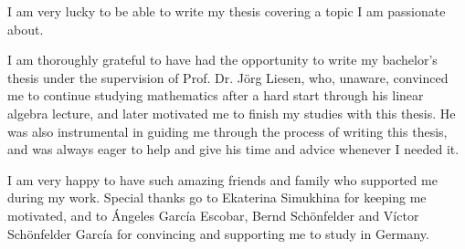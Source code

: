 I am very lucky to be able to write my thesis covering a topic I am passionate
about.

I am thoroughly grateful to have had the opportunity to write my bachelor’s thesis
under the supervision of Prof. Dr. Jörg Liesen, who, unaware, convinced me to continue studying mathematics after a hard start through his linear algebra lecture, and later motivated me to finish my studies with this thesis. He was also instrumental in guiding me through the process of writing this thesis, and was always eager to help and give his time and advice whenever I needed it.

I am very happy to have such amazing friends and family who supported me
during my work. Special thanks go to Ekaterina Simukhina for keeping me motivated, and to Ángeles García Escobar, Bernd Schönfelder and Víctor Schönfelder García for convincing and supporting me to study in Germany.